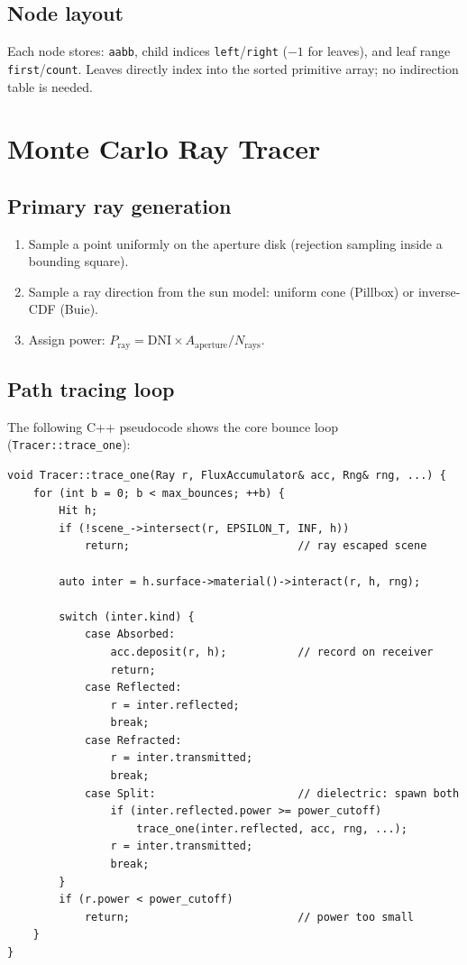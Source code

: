 \documentclass[12pt,a4paper]{report}
\begin{document}
\section{Node layout}

Each node stores: \texttt{aabb}, child indices \texttt{left}/\texttt{right} ($-1$ for
leaves), and leaf range \texttt{first}/\texttt{count}.  Leaves directly index into the sorted
primitive array; no indirection table is needed.

\chapter{Monte Carlo Ray Tracer}

\section{Primary ray generation}

\begin{enumerate}
  \item Sample a point uniformly on the aperture disk (rejection sampling inside a bounding
        square).
  \item Sample a ray direction from the sun model: uniform cone (Pillbox) or inverse-CDF
        (Buie).
  \item Assign power: $P_{\text{ray}} = \text{DNI}\times A_{\text{aperture}} / N_{\text{rays}}$.
\end{enumerate}

\section{Path tracing loop}

The following C++ pseudocode shows the core bounce loop (\texttt{Tracer::trace\_one}):

\begin{lstlisting}[style=cpp, caption={Core ray bounce loop (Tracer.cpp)}]
void Tracer::trace_one(Ray r, FluxAccumulator& acc, Rng& rng, ...) {
    for (int b = 0; b < max_bounces; ++b) {
        Hit h;
        if (!scene_->intersect(r, EPSILON_T, INF, h))
            return;                          // ray escaped scene

        auto inter = h.surface->material()->interact(r, h, rng);

        switch (inter.kind) {
            case Absorbed:
                acc.deposit(r, h);           // record on receiver
                return;
            case Reflected:
                r = inter.reflected;
                break;
            case Refracted:
                r = inter.transmitted;
                break;
            case Split:                      // dielectric: spawn both
                if (inter.reflected.power >= power_cutoff)
                    trace_one(inter.reflected, acc, rng, ...);
                r = inter.transmitted;
                break;
        }
        if (r.power < power_cutoff)
            return;                          // power too small
    }
}
\end{lstlisting}
\end{document}
